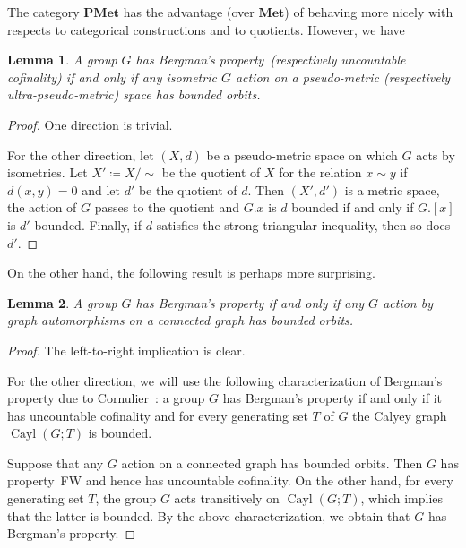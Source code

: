 \documentclass[a4paper]{article}
\newtheorem{lem}{Lemma}[section]
\theoremstyle{definition}
\DeclareMathOperator\Cayley{Cayl}
\newcommand*{\category}[1]{\textbf{#1}}
\newcommand*{\PMet}{\category{PMet}}
\newcommand*{\FW}{FW}
\begin{document}
The category $\PMet$ has the advantage (over $\category{Met}$) of behaving more nicely with respects to categorical constructions and to quotients.
However, we have
%
%
\begin{lem}\label{Lemma:BergQPMet}
A group $G$ has Bergman's property~(respectively uncountable cofinality) if and only if any isometric $G$ action on a pseudo-metric (respectively ultra-pseudo-metric) space has bounded orbits.
\end{lem}
\begin{proof}
One direction is trivial.

For the other direction, let $(X,d)$ be a pseudo-metric space on which $G$ acts by isometries.
Let $X'\coloneqq X/\sim$ be the quotient of $X$ for the relation $x\sim y$ if $d(x,y)=0$ and let $d'$ be the quotient of $d$.
Then $(X',d')$ is a metric space, the action of $G$ passes to the quotient and $G.x$ is $d$ bounded if and only if $G.[x]$ is $d'$ bounded.
Finally, if $d$ satisfies the strong triangular inequality, then so does~$d'$.
\end{proof}
%
%
On the other hand, the following result is perhaps more surprising.
%
%
\begin{lem}
A group $G$ has Bergman's property if and only if any $G$ action by graph automorphisms on a connected graph has bounded orbits.
\end{lem}
\begin{proof}
The left-to-right implication is clear.

For the other direction, we will use the following characterization of Bergman's property due to Cornulier~\cite{MR2240370}: a group $G$ has Bergman's property if and only if it has uncountable cofinality and for every generating set $T$ of $G$ the Calyey graph $\Cayley(G;T)$ is bounded.

Suppose that any $G$ action on a connected graph has bounded orbits.
Then $G$ has property~\FW{} and hence has uncountable cofinality.
On the other hand, for every generating set $T$, the group $G$ acts transitively on $\Cayley(G;T)$, which implies that the latter is bounded.
By the above characterization, we obtain that $G$ has Bergman's property.
\end{proof}
\end{document}
